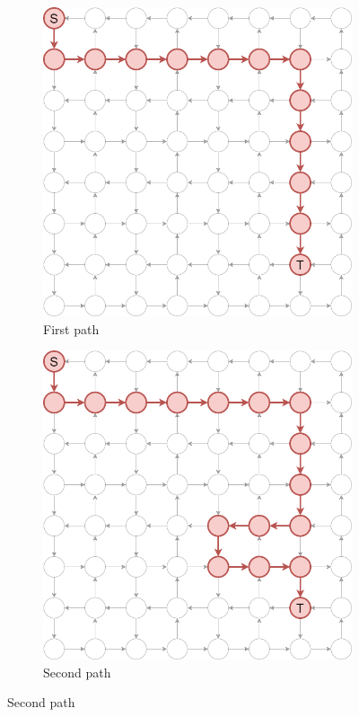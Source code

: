 \documentclass[12pt, oneside]{report}
\theoremstyle{plain}
\theoremstyle{definition}
\theoremstyle{indented}
\begin{document}
\begin{appendices}
\begin{figure}[ht]
\begin{subfigure}{.5\textwidth}
  \centering
\includegraphics[width=0.8\linewidth]{images/pathiterators/examples-Greedy DFS-1.png}
  \caption{First path}
\end{subfigure}
\begin{subfigure}{.5\textwidth}
  \centering
\includegraphics[width=0.8\linewidth]{images/pathiterators/examples-Greedy DFS-2.png}
  \caption{Second path}
\end{subfigure}


\end{figure}
\end{appendices}
\end{document}
